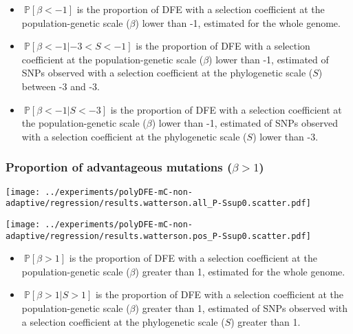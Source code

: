 \documentclass{article}
\newcommand{\proba}{\mathbb{P}}
\newcommand{\Sphy}{S}
\newcommand{\divStrongDel}{\Sphy < -3}
\newcommand{\divDel}{-3 < \Sphy < -1}
\newcommand{\divAdv}{ \Sphy > 1}
\newcommand{\Spop}{\beta}
\newcommand{\polyDel}{\Spop < -1}
\newcommand{\polyAdv}{ \Spop > 1}
\begin{document}
    \begin{itemize}
        \item $\ \proba [ \polyDel ]$ is the proportion of DFE with a selection coefficient at the population-genetic scale ($\Spop$) lower than -1, estimated for the whole genome.
        \item $\ \proba [ \polyDel | \divDel]$ is the proportion of DFE with a selection coefficient at the population-genetic scale ($\Spop$) lower than -1, estimated of SNPs observed with a selection coefficient at the phylogenetic scale ($\Sphy$) between -3 and -3.
        \item $\ \proba [ \polyDel | \divStrongDel ]$ is the proportion of DFE with a selection coefficient at the population-genetic scale ($\Spop$) lower than -1, estimated of SNPs observed with a selection coefficient at the phylogenetic scale ($\Sphy$) lower than -3.
    \end{itemize}


    \subsubsection{Proportion of advantageous mutations ($\polyAdv$)}

    \begin{minipage}{0.32\linewidth}
        \texttt{[image: ../experiments/polyDFE-mC-non-adaptive/regression/results.watterson.all\_P-Ssup0.scatter.pdf]}
    \end{minipage}
    \begin{minipage}{0.32\linewidth}
        \texttt{[image: ../experiments/polyDFE-mC-non-adaptive/regression/results.watterson.pos\_P-Ssup0.scatter.pdf]}
    \end{minipage}

    \begin{itemize}
        \item $\ \proba [ \polyAdv  ]$ is the proportion of DFE with a selection coefficient at the population-genetic scale ($\Spop$) greater than 1, estimated for the whole genome.
        \item $\ \proba [ \polyAdv | \divAdv] $ is the proportion of DFE with a selection coefficient at the population-genetic scale ($\Spop$) greater than 1, estimated of SNPs observed with a selection coefficient at the phylogenetic scale ($\Sphy$) greater than 1.
    \end{itemize}


    
\end{document}

